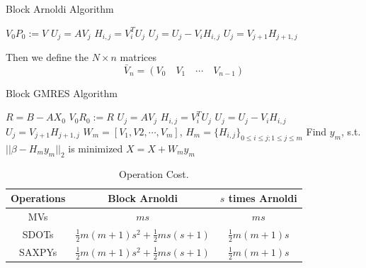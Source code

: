 \begin{algorithm}[htbp]{}
	\caption{Block Arnoldi Algorithm}   
	\label{alg:block arnoldi}   
	\begin{algorithmic}[1]
		\State $V_0P_0 := V$ 
		\State $U_j = AV_{j}$  
		\State $H_{i,j} = V_i^T U_j$ 
		\State $U_j = U_j - V_iH_{i,j}$ 
		\EndFor
		\State $U_j = V_{j+1}H_{j+1,j}$  
		\EndFor 
		\EndFunction
	\end{algorithmic}  
\end{algorithm}

Then we define the $N\times n$ matrices
\[\bar{V}_n = (V_0 \quad V_1  \quad \cdots  \quad V_{n-1})\]

\begin{algorithm}[htbp]{}
	\caption{Block GMRES Algorithm}   
	\label{alg:block gmres}   
	\begin{algorithmic}[1]
		\State $R = B - AX_0$
		\State $V_0R_0 := R$ 
		\State $U_j = AV_{j}$  
		\State $H_{i,j} = V_i^T U_j$ 
		\State $U_j = U_j - V_iH_{i,j}$ 
		\EndFor
		\State $U_j = V_{j+1}H_{j+1,j}$  
		\EndFor
		\State $W_m = [V_1, V2, \cdots, V_m]$, $H_m = \{H_{i,j}\}_{0 \leq i \leq j; 1 \leq j \leq m}$ 
		\State Find $y_m$, s.t. $||\beta - H_my_m||_2$ is minimized
		\State $X = X + W_my_m$
		\EndFunction
	\end{algorithmic}  
\end{algorithm}

\begin{table}[htbp]
	\renewcommand{\arraystretch}{1.4}
	\small	
	\caption{Operation Cost.}
	\label{block-arnoldi}
	\centering
	\begin{tabular}{c|c|c}
		\toprule
		Operations & Block Arnoldi & $s$ times Arnoldi  \\
		\midrule
		MVs  & $ms$ & $ms$ \\
		SDOTs & $\frac{1}{2}m(m+1)s^2+\frac{1}{2}ms(s+1)$ & $\frac{1}{2}m(m+1)s$   \\
		SAXPYs & $\frac{1}{2}m(m+1)s^2+\frac{1}{2}ms(s+1)$ & $\frac{1}{2}m(m+1)s$ \\
		\bottomrule
	\end{tabular}
\end{table}

